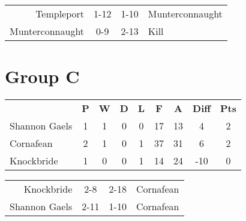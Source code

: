 \documentclass[11pt,a4paper]{article}
\begin{document}
\vspace{10 mm}

\begin{tabular}{rccl}
Templeport & 1-12 & 1-10 & Munterconnaught \\
Munterconnaught & 0-9 & 2-13 & Kill \\
\end{tabular}

\section*{Group C}

\begin{tabular}{lcccccccc}
 & \textbf{P} & \textbf{W} & \textbf{D} & \textbf{L} & \textbf{F} & \textbf{A} & \textbf{Diff} & \textbf{Pts} \\
Shannon Gaels & 1 & 1 & 0 & 0 & 17 & 13 & 4 & 2 \\
Cornafean & 2 & 1 & 0 & 1 & 37 & 31 & 6 & 2 \\
Knockbride & 1 & 0 & 0 & 1 & 14 & 24 & -10 & 0 \\
\end{tabular}

\vspace{10 mm}

\begin{tabular}{rccl}
Knockbride & 2-8 & 2-18 & Cornafean \\
Shannon Gaels & 2-11 & 1-10 & Cornafean \\
\end{tabular}
\end{document}
